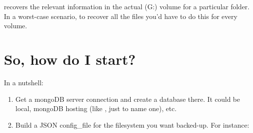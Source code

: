 \documentclass[letterpaper,10pt,english]{sphinxmanual}
\begin{document}
\begin{sphinxVerbatim}[commandchars=\\\{\}]
     \PYGZbs{}\PYGZbs{}
\end{sphinxVerbatim}

recovers the relevant information in the actual (G:) volume for a particular folder. In a worst-case scenario, to recover all the files
you'd have to do this for every volume.


\section{So, how do I start?}
\label{\detokenize{index:so-how-do-i-start}}
In a nutshell:
\begin{enumerate}
\item {} 
Get a mongoDB server connection and create a database there. It could be local, mongoDB hosting (like  , just to name one), etc.

\item {} 
Build a JSON config\_file for the filesystem you want backed-up. For instance:

\end{enumerate}

\begin{sphinxVerbatim}[commandchars=\\\{\}]
   
   \PYG{p}{[}
  \PYG{p}{]}
   
\end{sphinxVerbatim}
\end{document}
